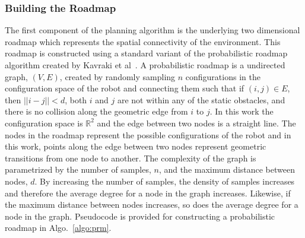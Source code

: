 \documentclass[letterpaper, 10pt, conference]{ieeeconf}
\begin{document}
\subsubsection{Building the Roadmap}

The first component of the planning algorithm is the underlying two dimensional
roadmap which represents the spatial connectivity of the environment. This
roadmap is constructed using a standard variant of the probabilistic roadmap
algorithm created by Kavraki et al~\cite{prm}. A probabilistic roadmap is a
undirected graph, $(V, E)$, created by randomly sampling $n$ configurations in
the configuration space of the robot and connecting them such that if $(i, j)
\in E$, then $||i - j|| < d$, both $i$ and $j$ are not within any of the static
obstacles, and there is no collision along the geometric edge from $i$ to $j$.
In this work the configuration space is $\mathbb{R}^2$ and the edge between two
nodes is a straight line. The nodes in the roadmap represent the possible
configurations of the robot and in this work, points along the edge between two
nodes represent geometric transitions from one node to another. The complexity
of the graph is parametrized by the number of samples, $n$, and the maximum
distance between nodes, $d$. By increasing the number of samples, the density
of samples increases and therefore the average degree for a node in the graph
increases.  Likewise, if the maximum distance between nodes increases, so does
the average degree for a node in the graph.  Pseudocode is provided for
constructing a probabilistic roadmap in Algo.~\ref{algo:prm}.
\end{document}

